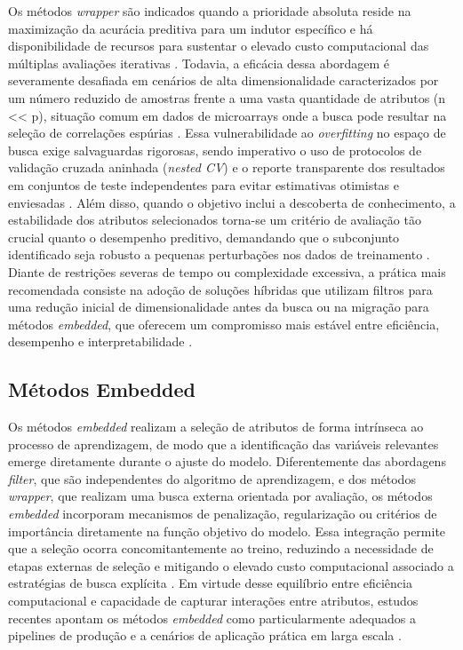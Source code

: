 \bigskip Os métodos \textit{wrapper} são indicados quando a prioridade absoluta reside na maximização da acurácia preditiva para um indutor específico e há disponibilidade de recursos para sustentar o elevado custo computacional das múltiplas avaliações iterativas \cite{KOHAVI1997273,Theng2024,Emmoh2024}. Todavia, a eficácia dessa abordagem é severamente desafiada em cenários de alta dimensionalidade caracterizados por um número reduzido de amostras frente a uma vasta quantidade de atributos (n << p), situação comum em dados de microarrays onde a busca pode resultar na seleção de correlações espúrias \cite{bolon2018scalability,bashir2022novel,Theng2024}. Essa vulnerabilidade ao \textit{overfitting} no espaço de busca exige salvaguardas rigorosas, sendo imperativo o uso de protocolos de validação cruzada aninhada (\textit{nested CV}) e o reporte transparente dos resultados em conjuntos de teste independentes para evitar estimativas otimistas e enviesadas \cite{reunanen2012overfitting,Dhal2022}. Além disso, quando o objetivo inclui a descoberta de conhecimento, a estabilidade dos atributos selecionados torna-se um critério de avaliação tão crucial quanto o desempenho preditivo, demandando que o subconjunto identificado seja robusto a pequenas perturbações nos dados de treinamento \cite{KHAIRE20221060,BARBIERI2024123667}. Diante de restrições severas de tempo ou complexidade excessiva, a prática mais recomendada consiste na adoção de soluções híbridas que utilizam filtros para uma redução inicial de dimensionalidade antes da busca ou na migração para métodos \textit{embedded}, que oferecem um compromisso mais estável entre eficiência, desempenho e interpretabilidade \cite{Theng2024,EBRAHIMIWARKIANI2025129372,Bouchlaghem2022}.


\subsection{Métodos Embedded}
\label{subsec:embedded}

Os métodos \textit{embedded} realizam a seleção de atributos de forma intrínseca ao processo de aprendizagem, de modo que a identificação das variáveis relevantes emerge diretamente durante o ajuste do modelo. Diferentemente das abordagens \textit{filter}, que são independentes do algoritmo de aprendizagem, e dos métodos \textit{wrapper}, que realizam uma busca externa orientada por avaliação, os métodos \textit{embedded} incorporam mecanismos de penalização, regularização ou critérios de importância diretamente na função objetivo do modelo. Essa integração permite que a seleção ocorra concomitantemente ao treino, reduzindo a necessidade de etapas externas de seleção e mitigando o elevado custo computacional associado a estratégias de busca explícita \cite{10.1007/978-3-031-23092-9_12,Theng2024,Dhal2022}. Em virtude desse equilíbrio entre eficiência computacional e capacidade de capturar interações entre atributos, estudos recentes apontam os métodos \textit{embedded} como particularmente adequados a pipelines de produção e a cenários de aplicação prática em larga escala \cite{EBRAHIMIWARKIANI2025129372,Bouchlaghem2022,Emmoh2024}.

